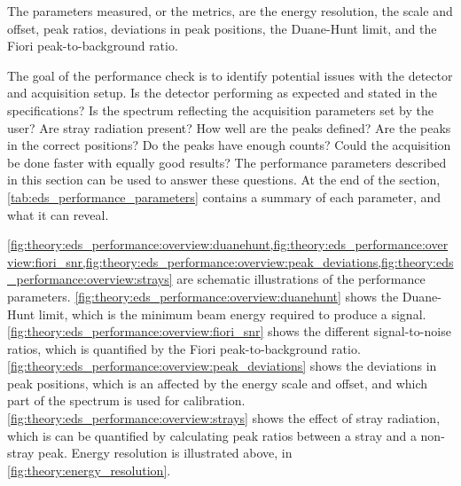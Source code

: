 


The parameters measured, or the metrics, are the energy resolution, the scale and offset, peak ratios, deviations in peak positions, the Duane-Hunt limit, and the Fiori peak-to-background ratio.


The goal of the performance check is to identify potential issues with the detector and acquisition setup.
Is the detector performing as expected and stated in the specifications?
Is the spectrum reflecting the acquisition parameters set by the user?
Are stray radiation present?
How well are the peaks defined?
Are the peaks in the correct positions?
Do the peaks have enough counts?
Could the acquisition be done faster with equally good results?
The performance parameters described in this section can be used to answer these questions.
At the end of the section, \cref{tab:eds_performance_parameters} contains a summary of each parameter, and what it can reveal.


\cref{fig:theory:eds_performance:overview:duanehunt,fig:theory:eds_performance:overview:fiori_snr,fig:theory:eds_performance:overview:peak_deviations,fig:theory:eds_performance:overview:strays} are schematic illustrations of the performance parameters.
\cref{fig:theory:eds_performance:overview:duanehunt} shows the Duane-Hunt limit, which is the minimum beam energy required to produce a signal.
\cref{fig:theory:eds_performance:overview:fiori_snr} shows the different signal-to-noise ratios, which is quantified by the Fiori peak-to-background ratio.
\cref{fig:theory:eds_performance:overview:peak_deviations} shows the deviations in peak positions, which is an affected by the energy scale and offset, and which part of the spectrum is used for calibration.
\cref{fig:theory:eds_performance:overview:strays} shows the effect of stray radiation, which is can be quantified by calculating peak ratios between a stray and a non-stray peak.
Energy resolution is illustrated above, in \cref{fig:theory:energy_resolution}.

